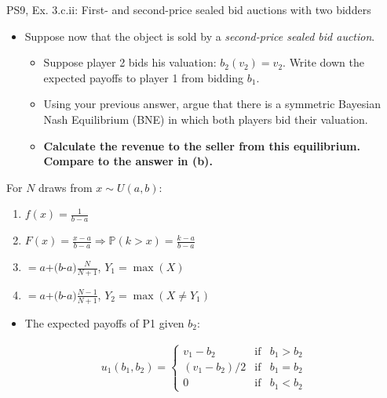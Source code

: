 \begin{frame}{PS9, Ex. 3.c.ii: First- and second-price sealed bid auctions with two bidders}
    \begin{multicols}{2}
      \begin{itemize}
        \item[(c)] Suppose now that the object is sold by a \textit{second-price sealed bid auction}.
        \begin{itemize}\normalsize
          \item[i.]   Suppose player 2 bids his valuation: $b_2(v_2) = v_2$. Write down the expected payoffs to player 1 from bidding $b_1$.
          \item[ii.]  Using your previous answer, argue that there is a symmetric Bayesian Nash Equilibrium (BNE) in which both players bid their valuation.
          \item[iii.] \textbf{Calculate the revenue to the seller from this equilibrium. Compare to the answer in (b).}
        \end{itemize}
      \end{itemize}
      For $N$ draws from $x\sim U(a, b):$
      \vspace{-6pt}
      \begin{enumerate}
        \item[PDF:] $f(x)=\frac{1}{b-a}$
        \item[CDF:] $F(x)=\frac{x-a}{b-a}\Rightarrow\mathbb{P}(k>x)=\frac{k-a}{b-a}$
        \item[$\mathbb{E}(Y_1)$] $=a$+$(b$-$a)\frac{N}{N+1}$, $Y_1=\max(X)$
        \item[$\mathbb{E}(Y_2)$] $=a$+$(b$-$a)\frac{N-1}{N+1}$, $Y_2=\max(X\neq Y_1)$
      \end{enumerate}
      \vfill\null\columnbreak
      \begin{itemize}
        \item[(i)] The expected payoffs of P1 given $b_2$:
      \end{itemize}
      \vspace{-12pt}
      \begin{align*}
        u_1(b_1,b_2)=\left\{\begin{array}{lcl}
          v_1-b_2     & \text{if} & b_1>b_2 \\
          (v_1-b_2)/2 & \text{if} & b_1=b_2 \\
          0           & \text{if} & b_1<b_2
        \end{array}\right.
      \end{align*}

\end{multicols}
\end{frame}
